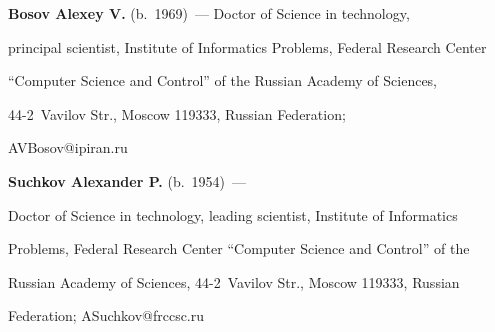      


     \Contr


     


     \noindent


     \textbf{Bosov Alexey V.} (b.\ 1969)~--- Doctor of Science in technology, 


principal scientist, Institute of Informatics Problems, Federal Research Center 


``Computer Science and Control'' of the Russian Academy of Sciences,  


44-2~Vavilov Str., Moscow 119333, Russian Federation; 


\mbox{AVBosov@ipiran.ru}


     


     \vspace*{3pt}


     


     \noindent


     \textbf{Suchkov Alexander P.} (b.\ 1954)~--- 


     Doctor of Science in technology, leading scientist, Institute of Informatics 


Problems, Federal Research Center ``Computer Science and Control'' of the 


Russian Academy of Sciences, 44-2~Vavilov Str., Moscow 119333, Russian 


Federation; \mbox{ASuchkov@frccsc.ru}


     


\label{end\stat}





\renewcommand{\bibname}{\protect\rm Литература}  


